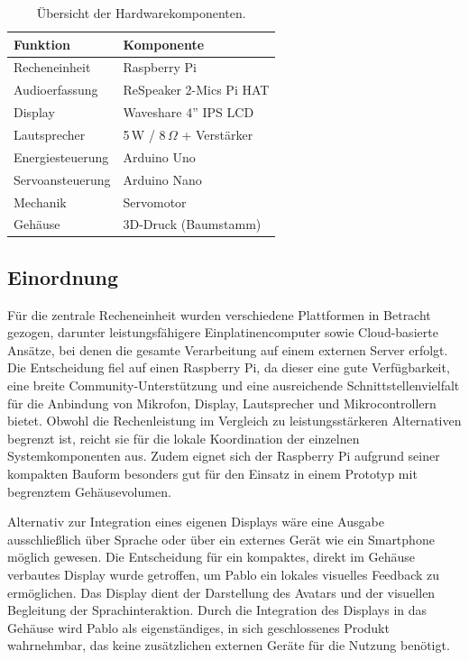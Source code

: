 \begin{table}[htbp]
\centering
\caption{Übersicht der Hardwarekomponenten.}
\label{tab:hardware}
\small
\begin{tabular}{@{}ll@{}}
\toprule
\textbf{Funktion} & \textbf{Komponente} \\
\midrule
Recheneinheit & Raspberry Pi \\
Audioerfassung & ReSpeaker 2-Mics Pi HAT \\
Display & Waveshare 4'' IPS LCD \\
Lautsprecher & 5\,W / 8\,$\Omega$ + Verstärker \\
Energiesteuerung & Arduino Uno \\
Servoansteuerung & Arduino Nano \\
Mechanik & Servomotor \\
Gehäuse & 3D-Druck (Baumstamm) \\
\bottomrule
\end{tabular}
\end{table}


\subsection{Einordnung}

Für die zentrale Recheneinheit wurden verschiedene Plattformen in Betracht gezogen, darunter leistungsfähigere Einplatinencomputer sowie Cloud-basierte Ansätze, bei denen die gesamte Verarbeitung auf einem externen Server erfolgt.
Die Entscheidung fiel auf einen Raspberry Pi, da dieser eine gute Verfügbarkeit, eine breite Community-Unterstützung und eine ausreichende Schnittstellenvielfalt für die Anbindung von Mikrofon, Display, Lautsprecher und Mikrocontrollern bietet.
Obwohl die Rechenleistung im Vergleich zu leistungsstärkeren Alternativen begrenzt ist, reicht sie für die lokale Koordination der einzelnen Systemkomponenten aus.
Zudem eignet sich der Raspberry Pi aufgrund seiner kompakten Bauform besonders gut für den Einsatz in einem Prototyp mit begrenztem Gehäusevolumen.

Alternativ zur Integration eines eigenen Displays wäre eine Ausgabe ausschließlich über Sprache oder über ein externes Gerät wie ein Smartphone möglich gewesen.
Die Entscheidung für ein kompaktes, direkt im Gehäuse verbautes Display wurde getroffen, um Pablo ein lokales visuelles Feedback zu ermöglichen.
Das Display dient der Darstellung des Avatars und der visuellen Begleitung der Sprachinteraktion.
Durch die Integration des Displays in das Gehäuse wird Pablo als eigenständiges, in sich geschlossenes Produkt wahrnehmbar, das keine zusätzlichen externen Geräte für die Nutzung benötigt.